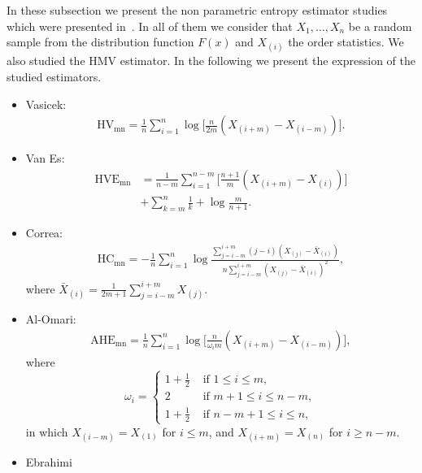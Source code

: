 \documentclass[journal]{IEEEtran}
\begin{document}
In these subsection we present the non parametric entropy estimator studies which were presented in~\cite{AlOmari2013}. In all of them we consider that $X_1,\ldots,X_n$ be a random sample from the distribution function $F(x)$ and $X_{(i)}$ the order statistics. We also studied the HMV estimator.
In the following we present the expression of the studied estimators. 
\begin{itemize}
	\item Vasicek:
	 \begin{align}
	 	\label{HV}
		\text{HV}_\text{{mn}}=\frac{1}{n} \sum_{i=1}^{n} \log \Big[\frac{n}{2 m}\left(X_{(i+m)}-X_{(i-m)}\right)\Big].
	\end{align}
	\item Van Es:
	\begin{align}
		\label{HVE}
		\text{HVE}_\text{{mn}}&=\frac{1}{n-m} \sum_{i=1}^{n-m}\Big[\frac{n+1}{m}\left(X_{(i+m)}-X_{(i)}\right)\Big] \nonumber\\
		        &+\sum_{k=m}^{n} \frac{1}{k}+\log \frac{m}{n+1}.
	\end{align}
	\item Correa:
	\begin{align}
		\label{HC}
		\text{HC}_\text{{mn}}=-\frac{1}{n} \sum_{i=1}^{n} \log \frac{\sum_{j=i-m}^{i+m}(j-i)\left(X_{(j)}-\bar{X}_{(i)}\right)}{n \sum_{j=i-m}^{i+m}\left(X_{(j)}-\bar{X}_{(i)}\right)^{2}},
	\end{align}
where $\bar{X}_{(i)}=\frac{1}{2 m+1} \sum_{j=i-m}^{i+m} X_{(j)}$.
	\item Al-Omari:
	\begin{align}
	\text{AHE}_\text{{mn}}=\frac{1}{n} \sum_{i=1}^{n} \log \Big[\frac{n}{\omega_{i} m}\left(X_{(i+m)}-X_{(i-m)}\right)\Big], 
		\label{AHE}
	\end{align}
	where
	\begin{equation*}
	\omega_{i}= \begin{cases}
		1+\frac{1}{2} & \text{ if }1 \leq i \leq m, \\
		2 & \text{ if } m+1 \leq i \leq n-m, \\
		1+\frac{1}{2} & \text{ if } n-m+1 \leq i \leq n,
				\end{cases}
	\end{equation*}
	in which $X_{(i-m)}=X_{(1)}$ for $i \leq m$, and $X_{(i+m)}=X_{(n)}$ for $i \geq n-m$.
	\item Ebrahimi

\end{itemize}
\end{document}
